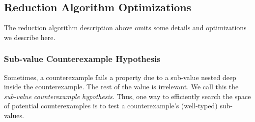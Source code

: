 \documentclass{sigplanconf}
\begin{document}

\subsection{Reduction Algorithm Optimizations}\label{sec:optimizations}
The reduction algorithm description above omits some details and optimizations
we describe here.

\subsubsection{Sub-value Counterexample Hypothesis}\label{sec:subval}
Sometimes, a counterexample fails a property due to a sub-value nested deep
inside the counterexample.  The rest of the value is irrelevant.  We call this
the \emph{sub-value counterexample hypothesis.}  Thus, one way to efficiently
search the space of potential counterexamples is to test a counterexample's
(well-typed) sub-values.
\end{document}
